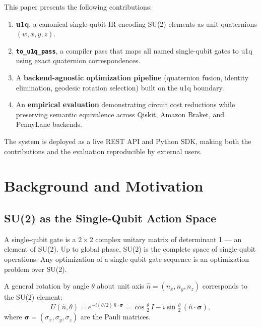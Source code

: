 \documentclass[conference]{IEEEtran}
\begin{document}
This paper presents the following contributions:

\begin{enumerate}
\item \textbf{u1q}, a canonical single-qubit IR encoding SU(2) elements as unit quaternions $(w, x, y, z)$.
\item \textbf{\texttt{to\_u1q\_pass}}, a compiler pass that maps all named single-qubit gates to u1q using exact quaternion correspondences.
\item A \textbf{backend-agnostic optimization pipeline} (quaternion fusion, identity elimination, geodesic rotation selection) built on the u1q boundary.
\item An \textbf{empirical evaluation} demonstrating circuit cost reductions while preserving semantic equivalence across Qiskit, Amazon Braket, and PennyLane backends.
\end{enumerate}

The system is deployed as a live REST API and Python SDK, making both the contributions and
the evaluation reproducible by external users.

\section{Background and Motivation}

\subsection{SU(2) as the Single-Qubit Action Space}

A single-qubit gate is a $2{\times}2$ complex unitary matrix of determinant 1 --- an element
of SU(2). Up to global phase, SU(2) is the complete space of single-qubit operations. Any
optimization of a single-qubit gate sequence is an optimization problem over SU(2).

A general rotation by angle $\theta$ about unit axis
$\hat{n} = (n_x, n_y, n_z)$ corresponds to the SU(2) element:
\begin{equation}
U(\hat{n}, \theta) = e^{-i (\theta/2)\, \hat{n} \cdot \boldsymbol{\sigma}}
= \cos\!\tfrac{\theta}{2}\,I - i\sin\!\tfrac{\theta}{2}\,(\hat{n} \cdot \boldsymbol{\sigma}),
\label{eq:su2}
\end{equation}
where $\boldsymbol{\sigma} = (\sigma_x, \sigma_y, \sigma_z)$ are the Pauli matrices.
\end{document}
